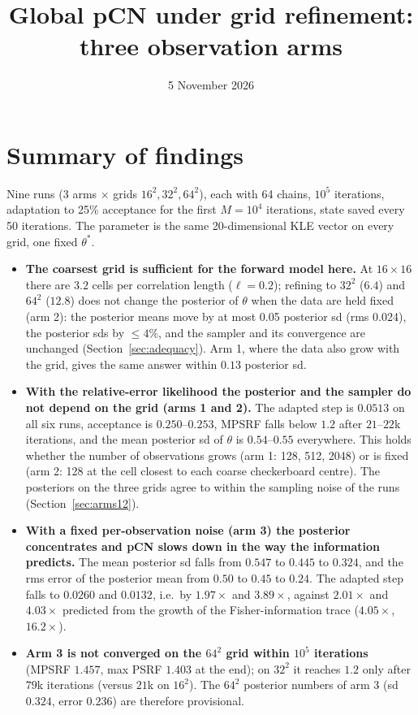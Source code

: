 \documentclass[11pt]{article}
\title{Global pCN under grid refinement: three observation arms}
\date{5 November 2026}
\begin{document}
\maketitle

\section{Summary of findings}
Nine runs (3 arms $\times$ grids $16^2,32^2,64^2$), each with 64 chains, $10^5$ iterations, adaptation to 25\% acceptance for the first $M=10^4$ iterations, state saved every 50 iterations. The parameter is the same 20-dimensional KLE vector on every grid, one fixed $\theta^*$.
\begin{itemize}
\item \textbf{The coarsest grid is sufficient for the forward model here.} At $16\times16$ there are $3.2$ cells per correlation length ($\ell=0.2$); refining to $32^2$ ($6.4$) and $64^2$ ($12.8$) does not change the posterior of $\theta$ when the data are held fixed (arm 2): the posterior means move by at most 0.05 posterior sd (rms 0.024), the posterior sds by $\le4\%$, and the sampler and its convergence are unchanged (Section~\ref{sec:adequacy}). Arm 1, where the data also grow with the grid, gives the same answer within $0.13$ posterior sd.
\item \textbf{With the relative-error likelihood the posterior and the sampler do not depend on the grid (arms 1 and 2).} The adapted step is $0.0513$ on all six runs, acceptance is $0.250$--$0.253$, MPSRF falls below $1.2$ after $21$--$22$k iterations, and the mean posterior sd of $\theta$ is $0.54$--$0.55$ everywhere. This holds whether the number of observations grows (arm 1: 128, 512, 2048) or is fixed (arm 2: 128 at the cell closest to each coarse checkerboard centre). The posteriors on the three grids agree to within the sampling noise of the runs (Section~\ref{sec:arms12}).
\item \textbf{With a fixed per-observation noise (arm 3) the posterior concentrates and pCN slows down in the way the information predicts.} The mean posterior sd falls from $0.547$ to $0.445$ to $0.324$, and the rms error of the posterior mean from $0.50$ to $0.45$ to $0.24$. The adapted step falls to $0.0260$ and $0.0132$, i.e.\ by $1.97\times$ and $3.89\times$, against $2.01\times$ and $4.03\times$ predicted from the growth of the Fisher-information trace ($4.05\times$, $16.2\times$).
\item \textbf{Arm 3 is not converged on the $64^2$ grid within $10^5$ iterations} (MPSRF $1.457$, max PSRF $1.403$ at the end); on $32^2$ it reaches $1.2$ only after $79$k iterations (versus $21$k on $16^2$). The $64^2$ posterior numbers of arm 3 (sd $0.324$, error $0.236$) are therefore provisional.

\end{itemize}
\end{document}
